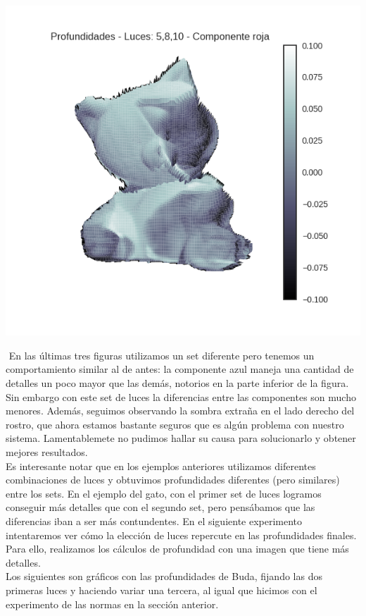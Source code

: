 {\centering
  \includegraphics[width=0.5\linewidth]{informe/imagenes/profundidades/gato5810Rojo.png}
}

$ $\newline
En las últimas tres figuras utilizamos un set diferente pero tenemos un comportamiento similar al de antes: la componente azul maneja una cantidad de detalles un poco mayor que las demás, notorios en la parte inferior de la figura. Sin embargo con este set de luces la diferencias entre las componentes son mucho menores. Además, seguimos observando la sombra extraña en el lado derecho del rostro, que ahora estamos bastante seguros que es algún problema con nuestro sistema. Lamentablemete no pudimos hallar su causa para solucionarlo y obtener mejores resultados. \\

Es interesante notar que en los ejemplos anteriores utilizamos diferentes combinaciones de luces y obtuvimos profundidades diferentes (pero similares) entre los sets. En el ejemplo del gato, con el primer set de luces logramos conseguir más detalles que con el segundo set, pero pensábamos que las diferencias iban a ser más contundentes. En el siguiente experimento intentaremos ver cómo la elección de luces repercute en las profundidades finales. Para ello, realizamos los cálculos de profundidad con una imagen que tiene más detalles. \\

Los siguientes son gráficos con las profundidades de Buda, fijando las dos primeras luces y haciendo variar una tercera, al igual que hicimos con el experimento de las normas en la sección anterior. \\




